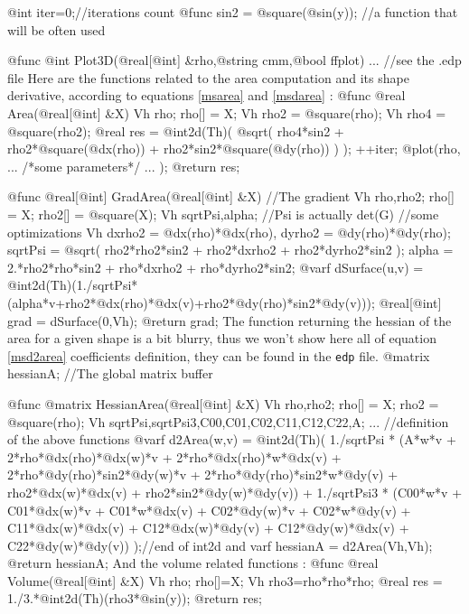 \documentclass[a4paper,twoside,12pt]{book}
\begin{document}
{

@int iter=0;//iterations count
@func sin2 = @square(@sin(y)); //a function that will be often used

@func @int Plot3D(@real[@int] &rho,@string cmm,@bool ffplot) {...} //see the .edp file
\eFF
Here are the functions related to the area computation and its shape derivative, according to equations \ref{msarea} and \ref{msdarea} :
\bFF
@func @real Area(@real[@int] &X) 
{
  Vh rho;
  rho[] = X;
  Vh rho2 = @square(rho);
  Vh rho4 = @square(rho2);
  @real res = @int2d(Th)(  @sqrt( rho4*sin2 
                              + rho2*@square(@dx(rho)) 
                              + rho2*sin2*@square(@dy(rho)) )  
                       );
  ++iter;
  @plot(rho,  ... /*some parameters*/ ... );
  @return res;
}

@func @real[@int] GradArea(@real[@int] &X) //The gradient
{
  Vh rho,rho2;
  rho[] = X;
  rho2[] = @square(X);
  Vh sqrtPsi,alpha; //Psi is actually det(G)
  {//some optimizations
    Vh  dxrho2 = @dx(rho)*@dx(rho), dyrho2 = @dy(rho)*@dy(rho);
    sqrtPsi = @sqrt( rho2*rho2*sin2 + rho2*dxrho2 + rho2*dyrho2*sin2 );
    alpha = 2.*rho2*rho*sin2 + rho*dxrho2 + rho*dyrho2*sin2;
  }
  @varf dSurface(u,v) = 
    @int2d(Th)(1./sqrtPsi*(alpha*v+rho2*@dx(rho)*@dx(v)+rho2*@dy(rho)*sin2*@dy(v)));
  @real[@int] grad = dSurface(0,Vh);
  @return grad;
}
\eFF
The function returning the hessian of the area for a given shape is a bit blurry, thus we won't show here all of equation \ref{msd2area} coefficients definition, they can be found in the {\tt edp} file. 
\bFF
@matrix hessianA; //The global matrix buffer

@func @matrix HessianArea(@real[@int] &X)
{
  Vh rho,rho2;
  rho[] = X;
  rho2 = @square(rho);
  Vh sqrtPsi,sqrtPsi3,C00,C01,C02,C11,C12,C22,A;
  {
    ... //definition of the above functions
  }
  @varf d2Area(w,v) =
    @int2d(Th)(
      1./sqrtPsi * (A*w*v + 2*rho*@dx(rho)*@dx(w)*v + 2*rho*@dx(rho)*w*@dx(v) 
                    + 2*rho*@dy(rho)*sin2*@dy(w)*v + 2*rho*@dy(rho)*sin2*w*@dy(v)
                    + rho2*@dx(w)*@dx(v) + rho2*sin2*@dy(w)*@dy(v)) 
    + 1./sqrtPsi3 * (C00*w*v + C01*@dx(w)*v + C01*w*@dx(v) + C02*@dy(w)*v 
                    + C02*w*@dy(v) + C11*@dx(w)*@dx(v)
                    + C12*@dx(w)*@dy(v) + C12*@dy(w)*@dx(v) + C22*@dy(w)*@dy(v)) 
     );//end of int2d and varf
  hessianA = d2Area(Vh,Vh);
  @return hessianA;
}
\eFF
And the volume related functions :
\bFF
@func @real Volume(@real[@int] &X)
{
  Vh rho;
  rho[]=X;
  Vh rho3=rho*rho*rho;
  @real res = 1./3.*@int2d(Th)(rho3*@sin(y));
  @return res;
}

}
\end{document}
